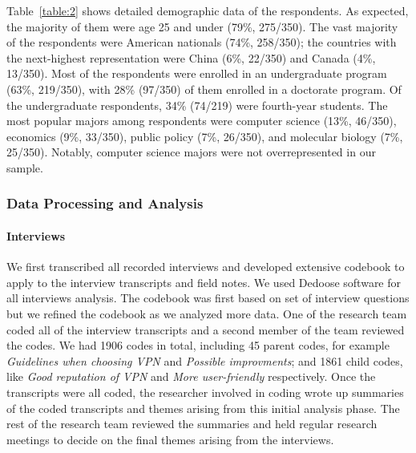 Table~\ref{table:2} shows detailed demographic data of the respondents. As expected, the
majority of them were age 25 and under (79\%, 275/350). The vast majority of
the respondents were American nationals (74\%, 258/350); the countries with
the next-highest representation were China (6\%, 22/350) and Canada (4\%,
13/350). Most of the respondents were enrolled in an undergraduate
program (63\%, 219/350), with 28\% (97/350) of them enrolled in a doctorate
program. Of the undergraduate respondents, 34\% (74/219) were fourth-year
students. The most popular majors among respondents were computer science
(13\%, 46/350), economics (9\%, 33/350), public policy (7\%, 26/350), and
molecular biology (7\%, 25/350). Notably, computer science majors were not
overrepresented in our sample.




\subsubsection{Data Processing and Analysis} 

\paragraph{Interviews} We first transcribed all recorded interviews and developed extensive codebook
to apply to the interview transcripts and field notes. We used Dedoose
software for all interviews analysis. The codebook was first based on set of interview
questions but we refined the codebook as we analyzed more data. One of the research team coded all of the interview transcripts and a second member of the team reviewed the codes. We had 1906
codes in total, including 45 parent codes, for example \textit{Guidelines when
choosing VPN} and \textit{Possible improvments}; and 1861 child codes, like
\textit{Good reputation of VPN} and \textit{More user-friendly} respectively. Once the transcripts were all coded, the researcher involved in coding wrote up summaries of the coded transcripts and themes arising from this initial analysis phase. The rest of the research team reviewed the summaries and held regular research meetings to decide on the final themes arising from the interviews.

